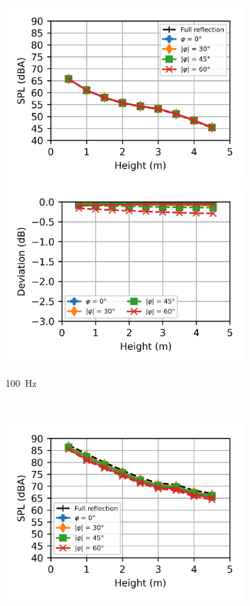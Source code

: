 \begin{figure}
	\centering
	\begin{subfigure}[b]{\textwidth}
		\centering
		\includegraphics{fig/chap5/impedance/third_octave/SPL_100_Hz.png}
		\hfill
		\includegraphics{fig/chap5/impedance/third_octave/deviation_100_Hz.png}
		\caption{\SI{100}{\hertz}}
	\end{subfigure}
	\\
	\begin{subfigure}[b]{\textwidth}
		\centering
		\includegraphics{fig/chap5/impedance/third_octave/SPL_1000_Hz.png}

\end{subfigure}
\end{figure}
